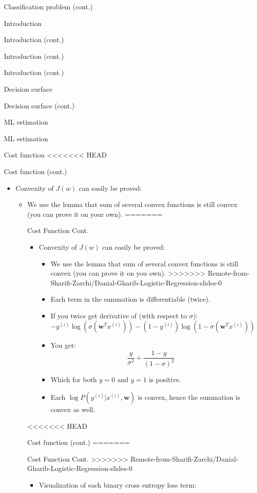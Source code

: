 \documentclass[serif, aspectratio=169]{beamer}
\begin{document}
\begin{frame}{Classification problem (cont.)}
\begin{itemize}
\begin{frame}{Introduction}
\begin{itemize}
\begin{frame}{Introduction (cont.)}
\begin{frame}{Introduction (cont.)}
\begin{frame}{Introduction (cont.)}
\begin{frame}{Decision surface}
\begin{itemize}
\begin{frame}{Decision surface (cont.)}
\begin{frame}{ML estimation}
\begin{frame}{ML estimation}
\begin{itemize}
\begin{frame}{Cost function}
<<<<<<< HEAD
\begin{frame}{Cost function (cont.)}
    \begin{itemize}
    \item Convexity of $J(w)$ can easily be proved:
        \begin{itemize}
            \item We use the lemma that sum of several convex functions is still convex (you can prove it on your own).
=======
\begin{frame}{Cost Function Cont.}
    \begin{itemize}
    \item Convexity of $J(w)$ can easily be proved:
        \begin{itemize}
            \item We use the lemma that sum of several convex functions is still convex (you can prove it on you own).
>>>>>>> Remote-from-Sharifi-Zarchi/Danial-Gharib-Logistic-Regression-slides-0
            \item Each term in the summation is differentiable (twice).
            \item If you twice get derivative of (with respect to $\sigma$):
                \[
                    -y^{(i)}\log (\sigma (\mathbf{w}^T x^{(i)})) - 
            (1-y^{(i)})\log (1 - \sigma (\mathbf{w}^T x^{(i)}))
                \]
            \item You get:
                \[
                    \frac{y}{\sigma ^2} + \frac{1-y}{(1-\sigma )^2}
                \]
            \item Which for both $y=0$ and $y=1$ is positive.
            \item Each $\log P(y^{(i)}|x^{(i)}, \mathbf{w})$ is convex, hence the summation is convex as well.
        \end{itemize}
    \end{itemize}
\end{frame}
<<<<<<< HEAD
\begin{frame}{Cost function (cont.)}
=======
\begin{frame}{Cost Function Cont.}
>>>>>>> Remote-from-Sharifi-Zarchi/Danial-Gharib-Logistic-Regression-slides-0
    \begin{itemize}
    \item Visualization of each binary cross entropy loss term:
    \end{itemize}
    \begin{center}

\end{center}
\end{frame}
\end{frame}
\end{itemize}
\end{itemize}
\end{frame}
\end{frame}
\end{itemize}
\end{frame}
\end{frame}
\end{frame}
\end{itemize}
\end{frame}
\end{frame}
\end{frame}
\end{frame}
\end{itemize}
\end{frame}
\end{itemize}
\end{frame}
\end{document}
